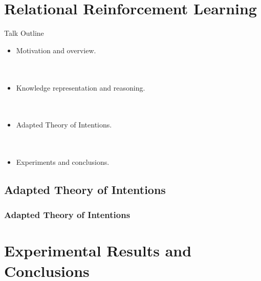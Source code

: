 \documentclass[xcolor=dvipsnames]{beamer}
\begin{document}
\section{Relational Reinforcement Learning}

\begin{frame}{Talk Outline}
  \begin{itemize}
  \item  Motivation and overview.
    \ \\
    \ \\
    \ \\
  \item Knowledge representation and reasoning.
    \ \\
    \ \\
    \ \\
  \item Adapted Theory of Intentions.
    \ \\
    \ \\
    \ \\
  \item Experiments and conclusions.
  \end{itemize}
\end{frame}


\subsection{Adapted Theory of Intentions}

\begin{frame}\frametitle{Adapted Theory of Intentions}

\end{frame}








\section{Experimental Results and Conclusions}
\end{document}
